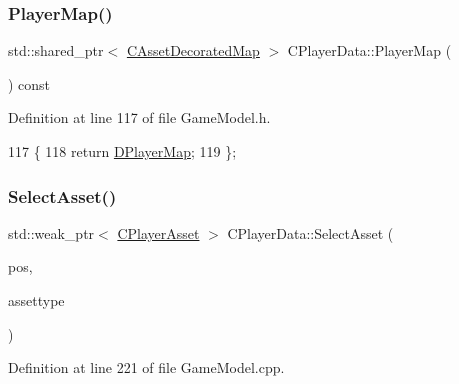 \subsubsection{\texorpdfstring{Player\+Map()}{PlayerMap()}}
{\footnotesize\ttfamily std\+::shared\+\_\+ptr$<$ \hyperlink{classCAssetDecoratedMap}{C\+Asset\+Decorated\+Map} $>$ C\+Player\+Data\+::\+Player\+Map (\begin{DoxyParamCaption}{ }\end{DoxyParamCaption}) const\hspace{0.3cm}{\ttfamily [inline]}}



Definition at line 117 of file Game\+Model.\+h.


\begin{DoxyCode}
117                                                              \{
118             \textcolor{keywordflow}{return} \hyperlink{classCPlayerData_a452163191cd4603e1e38dd8d4bb9691c}{DPlayerMap};   
119         \};
\end{DoxyCode}
\hypertarget{classCPlayerData_a1c926b101513f871ec85e34ac3c83ec4}{}\label{classCPlayerData_a1c926b101513f871ec85e34ac3c83ec4} 
\subsubsection{\texorpdfstring{Select\+Asset()}{SelectAsset()}}
{\footnotesize\ttfamily std\+::weak\+\_\+ptr$<$ \hyperlink{classCPlayerAsset}{C\+Player\+Asset} $>$ C\+Player\+Data\+::\+Select\+Asset (\begin{DoxyParamCaption}\item[{const \hyperlink{classCPosition}{C\+Position} \&}]{pos,  }\item[{\hyperlink{GameDataTypes_8h_a5600d4fc433b83300308921974477fec}{E\+Asset\+Type}}]{assettype }\end{DoxyParamCaption})}



Definition at line 221 of file Game\+Model.\+cpp.


